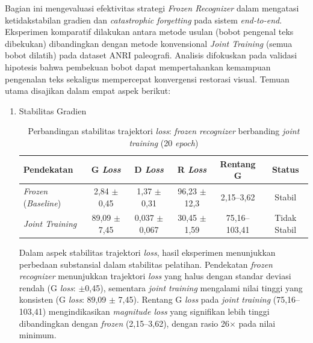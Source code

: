 Bagian ini mengevaluasi efektivitas strategi \textit{Frozen Recognizer} dalam mengatasi ketidakstabilan gradien dan \textit{catastrophic forgetting} pada sistem \textit{end-to-end}. Eksperimen komparatif dilakukan antara metode usulan (bobot pengenal teks dibekukan) dibandingkan dengan metode konvensional \textit{Joint Training} (semua bobot dilatih) pada dataset ANRI paleografi. Analisis difokuskan pada validasi hipotesis bahwa pembekuan bobot dapat mempertahankan kemampuan pengenalan teks sekaligus mempercepat konvergensi restorasi visual. Temuan utama disajikan dalam empat aspek berikut:
\begin{enumerate}[leftmargin=1.5em, labelsep=0.5em, itemindent=0pt, noitemsep, topsep=0pt, label=\arabic*., leftmargin=0.8cm]

    

    \item Stabilitas Gradien


          \begin{table}[!htbp]
              \caption[Perbandingan \textit{loss frozen} berbanding \textit{joint}]{Perbandingan stabilitas trajektori \textit{loss}: \textit{frozen recognizer} berbanding \textit{joint training} (20 \textit{epoch})}
              \label{tab:frozen-vs-joint-loss}
              \small
              \setlength{\tabcolsep}{3pt}
              \begin{tabularx}{\textwidth}{|>{\raggedright\arraybackslash}X|c|c|c|c|c|}
                  \hline
                  \textbf{Pendekatan}        & \textbf{G \textit{Loss}}           & \textbf{D \textit{Loss}}            & \textbf{R \textit{Loss}}           & \textbf{Rentang G}     & \textbf{Status}       \\
                  \hline
                  \textit{Frozen} (\textit{Baseline}) & 2,84 $\pm$ 0,45  & 1,37 $\pm$ 0,31   & 96,23 $\pm$ 12,3 & 2,15--3,62    & Stabil       \\
                  \textit{Joint Training}    & 89,09 $\pm$ 7,45 & 0,037 $\pm$ 0,067 & 30,45 $\pm$ 1,59 & 75,16--103,41 & Tidak Stabil \\
                  \hline
              \end{tabularx}
          \end{table}

          Dalam aspek stabilitas trajektori \textit{loss}, hasil eksperimen menunjukkan perbedaan substansial dalam stabilitas pelatihan. Pendekatan \textit{frozen recognizer} menunjukkan trajektori \textit{loss} yang halus dengan standar deviasi rendah (G \textit{loss}: $\pm$0,45), sementara \textit{joint training} mengalami nilai tinggi yang konsisten (G \textit{loss}: 89,09 $\pm$ 7,45). Rentang G \textit{loss} pada \textit{joint training} (75,16--103,41) mengindikasikan \textit{magnitude loss} yang signifikan lebih tinggi dibandingkan dengan \textit{frozen} (2,15--3,62), dengan rasio 26$\times$ pada nilai minimum.


\end{enumerate}
